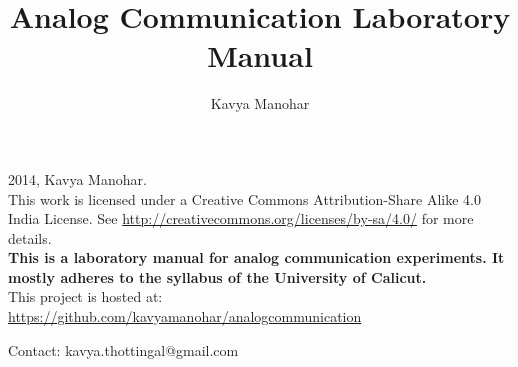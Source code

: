 \documentclass{book}
\begin{document}
\thispagestyle{empty}
\thispagestyle{empty}

\title{Analog Communication
Laboratory Manual}
\author{Kavya Manohar} {%
\maketitle
  
\noindent \textcopyright{}2014, Kavya Manohar.\\
\noindent
This work is licensed under a Creative Commons Attribution-Share Alike 4.0 India License. See \url{http://creativecommons.org/licenses/by-sa/4.0/} for more details.
\\[5cm]

\noindent \textbf{This is a laboratory manual for analog communication experiments. It mostly adheres to the syllabus of the  University of Calicut.}
\\

\noindent This project is hosted at:  \url{https://github.com/kavyamanohar/analogcommunication}


\noindent Contact: kavya.thottingal@gmail.com


\clearpage
\thispagestyle{plain}







\thispagestyle{empty}
\tableofcontents
\thispagestyle{empty}
\thispagestyle{empty}

\listoffigures
\thispagestyle{empty}




%
%




%
%
%

}
\end{document}
